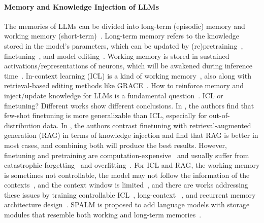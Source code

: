 \paragraph{Memory and Knowledge Injection of LLMs} 
The memories of LLMs can be divided into long-term (episodic) memory and working memory (short-term)~\cite{llm_controllable_working_memory,memoria,spalm}. Long-term memory refers to the knowledge stored in the model's parameters, which can be updated by (re)pretraining~\cite{gpt-1}, finetuning~\cite{lora}, and model editing~\cite{knowledge_editing_survey_1}. Working memory is stored in sustained activations/representations of neurons, which will be awakened during inference time~\cite{llm_controllable_working_memory}. In-context learning (ICL) is a kind of working memory~\cite{chain_of_thoughts}, also along with retrieval-based editing methods like GRACE~\cite{grace}. 
How to reinforce memory and inject/update knowledge for LLMs is a fundamental question~\cite{memoryllm,ft_vs_rag,fewshotft_vs_icl}. ICL or finetuning? Different works show different conclusions. In \cite{fewshotft_vs_icl}, the authors find that few-shot finetuning is more generalizable than ICL, especially for out-of-distribution data. In \cite{ft_vs_rag}, the authors contrast finetuning with retrieval-augmented generation (RAG) in terms of knowledge injection and find that RAG is better in most cases, and combining both will produce the best results. 
However, finetuning and pretraining are computation-expensive~\cite{llama-2,grace} and usually suffer from catastrophic forgetting~\cite{catastrophic_forgetting_llm} and overfitting~\cite{memorization_overfitting}. For ICL and RAG, the working memory is sometimes not controllable, the model may not follow the information of the contexts~\cite{llm_controllable_working_memory}, and the context window is limited~\cite{landmark_attention,infini_attention}, and there are works addressing these issues by training controllable ICL~\cite{llm_controllable_working_memory}, long-context ~\cite{landmark_attention,infini_attention}, and recurrent memory architecture design~\cite{memoryllm}. 
SPALM is proposed to add language models with storage modules that resemble both working and long-term memories~\cite{spalm}. 

